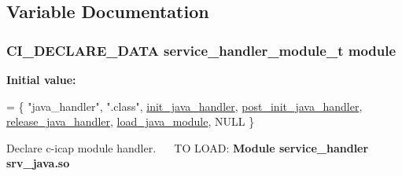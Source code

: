 \subsection{Variable Documentation}
\hypertarget{c-icap-java_8c_a13726af7b2896986044c777506196c76}{
\subsubsection[{module}]{\setlength{\rightskip}{0pt plus 5cm}C\+I\+\_\+\+D\+E\+C\+L\+A\+R\+E\+\_\+\+D\+A\+T\+A service\+\_\+handler\+\_\+module\+\_\+t module}}\label{c-icap-java_8c_a13726af7b2896986044c777506196c76}
{\bfseries Initial value\+:}
\begin{DoxyCode}
= \{
    \textcolor{stringliteral}{"java\_handler"},
    \textcolor{stringliteral}{".class"},
    \hyperlink{c-icap-java_8c_a8608028d6507eaa054dbfdda13263da9}{init\_java\_handler},
    \hyperlink{c-icap-java_8c_a472cf4c2c9280417823c49e3919bbf9b}{post\_init\_java\_handler},
    \hyperlink{c-icap-java_8c_a92dca6f4495d51ed83d22cbd9d96d143}{release\_java\_handler},
    \hyperlink{c-icap-java_8c_ac0e05d829e840acc75d0980ae4a51bd5}{load\_java\_module},
    NULL 
\}
\end{DoxyCode}
Declare c-\/icap module handler.~\newline
 ~\newline
 T\+O L\+O\+A\+D\+: {\bfseries Module service\+\_\+handler srv\+\_\+java.\+so} 